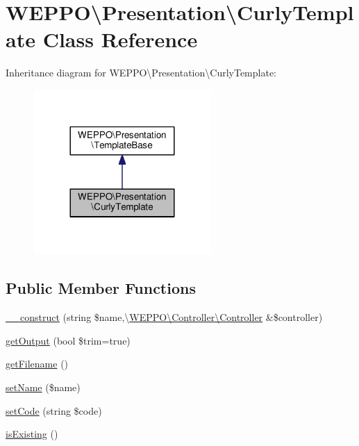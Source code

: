 \hypertarget{classWEPPO_1_1Presentation_1_1CurlyTemplate}{}\section{W\+E\+P\+PO\textbackslash{}Presentation\textbackslash{}Curly\+Template Class Reference}
\label{classWEPPO_1_1Presentation_1_1CurlyTemplate}


Inheritance diagram for W\+E\+P\+PO\textbackslash{}Presentation\textbackslash{}Curly\+Template\+:\nopagebreak
\begin{figure}[H]
\begin{center}
\leavevmode
\includegraphics[width=192pt]{classWEPPO_1_1Presentation_1_1CurlyTemplate__inherit__graph}
\end{center}
\end{figure}
\subsection*{Public Member Functions}
\begin{DoxyCompactItemize}
\item 
\hyperlink{classWEPPO_1_1Presentation_1_1CurlyTemplate_a8221afc5d003e1f4770c7f43d29f7326}{\+\_\+\+\_\+construct} (string \$name,\textbackslash{}\hyperlink{classWEPPO_1_1Controller_1_1Controller}{W\+E\+P\+P\+O\textbackslash{}\+Controller\textbackslash{}\+Controller} \&\$controller)
\item 
\hyperlink{classWEPPO_1_1Presentation_1_1CurlyTemplate_aa2acceca2249f432df3bb48f0cf4bc7b}{get\+Output} (bool \$trim=true)
\item 
\hyperlink{classWEPPO_1_1Presentation_1_1CurlyTemplate_a73fd40bc2b93facf97141342d43c5776}{get\+Filename} ()
\item 
\hyperlink{classWEPPO_1_1Presentation_1_1CurlyTemplate_afe27b61449a1ed55fb51bc96cf2150a3}{set\+Name} (\$name)
\item 
\hyperlink{classWEPPO_1_1Presentation_1_1CurlyTemplate_ae8cef866e0b0b576708e434ce145f91c}{set\+Code} (string \$code)
\item 
\hyperlink{classWEPPO_1_1Presentation_1_1CurlyTemplate_a98f9e314673011501a90001f80e8318f}{is\+Existing} ()
\end{DoxyCompactItemize}
